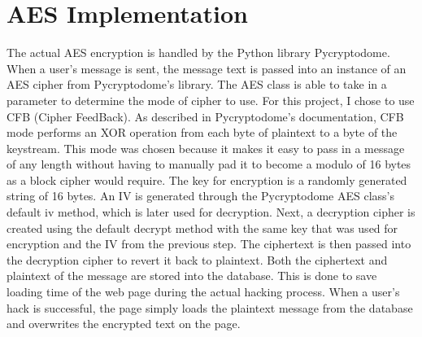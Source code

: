 \documentclass[conference]{csce}
\begin{document}
\section{AES Implementation}
The actual AES encryption is handled by the Python library Pycryptodome. When a user's message is sent, the message text is passed into an instance of an AES cipher from Pycryptodome's library. The AES class is able to take in a parameter to determine the mode of cipher to use. For this project, I chose to use CFB (Cipher FeedBack). As described in Pycryptodome's documentation, CFB mode performs an XOR operation from each byte of plaintext to a byte of the keystream. This mode was chosen because it makes it easy to pass in a message of any length without having to manually pad it to become a modulo of 16 bytes as a block cipher would require. The key for encryption is a randomly generated string of 16 bytes. An IV is generated through the Pycryptodome AES class's default iv method, which is later used for decryption. Next, a decryption cipher is created using the default decrypt method with the same key that was used for encryption and the IV from the previous step. The ciphertext is then passed into the decryption cipher to revert it back to plaintext. Both the ciphertext and plaintext of the message are stored into the database. This is done to save loading time of the web page during the actual hacking process. When a user's hack is successful, the page simply loads the plaintext message from the database and overwrites the encrypted text on the page.
\end{document}
